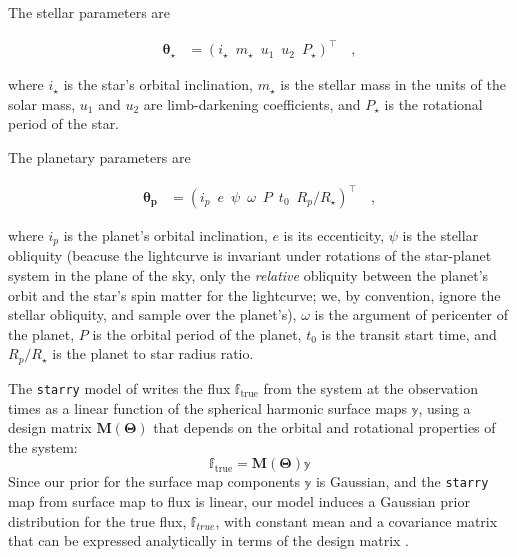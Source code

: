 \documentclass[twocolumn]{aastex631}
\begin{document}
The stellar parameters are 
\begin{linenomath}\begin{align}
    \label{eq:thetastar}
    \pmb{\theta_\star}
     & =
    \left(
    i_\star
    \,\,\,
    m_\star
    \,\,\,
    u_1
    \,\,\,
    u_2
    \,\,\,
    P_\star
    \right)^\top
    \quad,
\end{align}\end{linenomath}
where $i_\star$ is the star's orbital inclination, $m_\star$ is the stellar mass in the units of the solar mass, $u_1$ and $u_2$ are limb-darkening coefficients,
and $P_\star$ is the rotational period of the star.

The planetary parameters are 
\begin{linenomath}\begin{align}
    \label{eq:thetap}
    \pmb{\theta_p}
     & =
    \left(
    i_p
    \,\,\,
    e
    \,\,\,
    \psi
    \,\,\,
    \omega
    \,\,\, P \,\,\, t_0 \,\,\, R_p/R_\star \right)^\top \quad,
    \end{align}
\end{linenomath} 
%
where $i_p$ is the planet's orbital inclination, $e$ is its eccenticity,
$\psi$ is the stellar obliquity (beacuse the lightcurve is
invariant under rotations of the star-planet system in the plane of the sky,
only the \emph{relative} obliquity between the planet's orbit and the star's
spin matter for the lightcurve; we, by convention, ignore the stellar obliquity,
and sample over the planet's), $\omega$ is the argument of pericenter of the
planet, $P$ is the orbital period of the planet, $t_0$ is the transit start
time, and $R_p/R_\star$ is the planet to star radius ratio.

The \texttt{starry} model of \citet{Luger2019} writes the flux
$\mathbb{f}_\mathrm{true}$ from the system at the observation times as a linear
function of the spherical harmonic surface maps $\mathbb{y}$, using a design
matrix $\pmb{M}\left( \pmb{\Theta} \right)$ that depends on the orbital and
rotational properties of the system:
\begin{equation}
    \mathbb{f}_\mathrm{true} = \pmb{M}\left( \pmb{\Theta} \right) \mathbb{y}
\end{equation}
Since our prior for the surface map components $\mathbb{y}$ is Gaussian, and the
\texttt{starry} map from surface map to flux is linear, our model induces a
Gaussian prior distribution for the true flux, $\mathbb{f}_{true}$, with
constant mean and a covariance matrix that can be expressed analytically in
terms of the design matrix \citep{Luger2021b}. 
\end{document}
